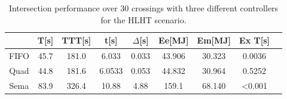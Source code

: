 \begin{table}
\begin{tabular}{|c|c|c|c|c|c|c|c|c|}
\hline
& T[s]&TTT[s]&t[s]&$\Delta$[s]&Ee[MJ]&Em[MJ]&Ex T[s]\\
\hline
FIFO & 45.7 & 181.0 & 6.033 & 0.033 & 43.906 & 30.323 & 0.0036\\
Quad & 44.8 &181.6& 6.0533 & 0.053 & 44.832 & 30.964 & 0.5252\\
Sema & 83.9 & 326.4 & 10.88 & 4.88 & 159.1 & 68.140 & <0.001\\
\hline
\end{tabular}
\label{tab:results}
\caption{Intersection performance over 30 crossings with three different controllers for the HLHT scenario. }
\end{table}

